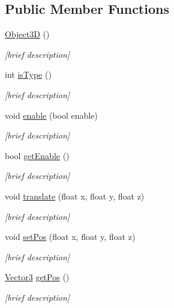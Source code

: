 \subsection*{Public Member Functions}
\begin{DoxyCompactItemize}
\item 
\hyperlink{class_object3_d_ae3a1b17fb43ab59f5cf7b0ee21b9120b}{Object3\-D} ()
\begin{DoxyCompactList}\small\item\em \mbox{[}brief description\mbox{]} \end{DoxyCompactList}\item 
int \hyperlink{class_object3_d_af9a973bc07b6dcdacefebe20023a1d51}{is\-Type} ()
\begin{DoxyCompactList}\small\item\em \mbox{[}brief description\mbox{]} \end{DoxyCompactList}\item 
void \hyperlink{class_object3_d_a83b58f2bd94df5fb41cdd2ad2718b738}{enable} (bool enable)
\begin{DoxyCompactList}\small\item\em \mbox{[}brief description\mbox{]} \end{DoxyCompactList}\item 
bool \hyperlink{class_object3_d_ac51d638d70d1200d44d468945bfc0356}{get\-Enable} ()
\begin{DoxyCompactList}\small\item\em \mbox{[}brief description\mbox{]} \end{DoxyCompactList}\item 
void \hyperlink{class_object3_d_a1362e9e4752b6ce4bddb1fa69e0e0894}{translate} (float x, float y, float z)
\begin{DoxyCompactList}\small\item\em \mbox{[}brief description\mbox{]} \end{DoxyCompactList}\item 
void \hyperlink{class_object3_d_a4913643d7f24106e2272e3cf6c49bb8e}{set\-Pos} (float x, float y, float z)
\begin{DoxyCompactList}\small\item\em \mbox{[}brief description\mbox{]} \end{DoxyCompactList}\item 
\hyperlink{struct_vector3}{Vector3} \hyperlink{class_object3_d_a7c4949df5017e162cd5921ed18061730}{get\-Pos} ()
\begin{DoxyCompactList}\small\item\em \mbox{[}brief description\mbox{]} \end{DoxyCompactList}\item 

\end{DoxyCompactItemize}
